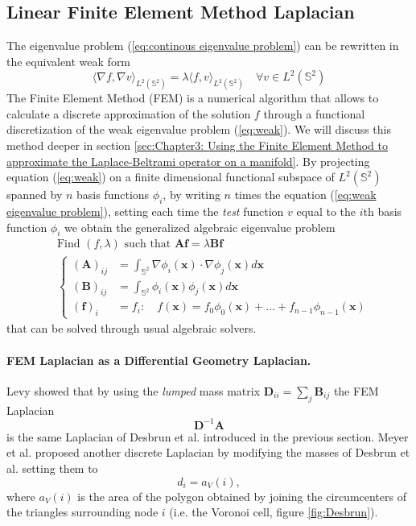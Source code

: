 \subsection{Linear Finite Element Method Laplacian}
The eigenvalue problem (\ref{eq:continous eigenvalue problem}) can be rewritten in the equivalent weak form
\begin{equation}\label{eq:weak}
	\langle \nabla f, \nabla v\rangle_{L^2(\mathbb S^2)} = \lambda \langle  f, v\rangle_{L^2(\mathbb S^2)} \quad \forall v \in L^2(\mathbb S^2)
\end{equation}
The Finite Element Method (FEM) is a numerical algorithm that allows to calculate a discrete approximation of the solution $f$ through a functional discretization of the weak eigenvalue problem (\ref{eq:weak}). We will discuss this method deeper in section \ref{sec:Chapter3: Using the Finite Element Method to approximate the Laplace-Beltrami operator on a manifold}. By projecting equation (\ref{eq:weak}) on a finite dimensional functional subspace of $L^2(\mathbb S^2)$ spanned by $n$ basis functions $\phi_i$, by writing $n$ times the equation (\ref{eq:weak eigenvalue problem}), setting each time the \textit{test} function $v$ equal to the $i$th basis function $\phi_i$ we obtain the generalized algebraic eigenvalue problem
$$
\begin{aligned}
&\text{Find }(f,\lambda)\text{ such that }\mathbf A\mathbf f = \lambda \mathbf B \mathbf f\\
&\begin{cases}
(\mathbf A)_{ij} &= \int_{\mathbb S^2}\nabla \phi_i(\mathbf{x})\cdot \nabla \phi_j(\mathbf{x})d\mathbf{x}\\
(\mathbf B)_{ij} &= \int_{\mathbb S^2} \phi_i(\mathbf{x}) \phi_j(\mathbf{x})d\mathbf{x}\\
(\mathbf f)_i &= f_i:\quad f(\mathbf x) = f_0\phi_0(\mathbf x)+ ... + f_{n-1}\phi_{n-1}(\mathbf x) 
\end{cases}
\end{aligned}
$$
that can be solved through usual algebraic solvers. 

\paragraph{FEM Laplacian as a Differential Geometry Laplacian.} Levy \cite{levy} showed that by using the \textit{lumped} mass matrix $\mathbf D_{ii} = \sum_j \mathbf B_{ij}$ the FEM Laplacian 
$$
\mathbf D^{-1}\mathbf A
$$
is the same Laplacian of Desbrun et al. \cite{Desbrun1999} introduced in the previous section. Meyer et al. \cite{Meyer02discretedifferential-geometry} proposed another discrete Laplacian by modifying the masses of Desbrun et al. setting them to 
$$
d_i=a_{V}(i),
$$
where \(a_{V}(i)\) is the area of the polygon obtained by joining the circumcenters of the triangles surrounding node $i$ (i.e. the Voronoi cell, figure \ref{fig:Desbrun}).

